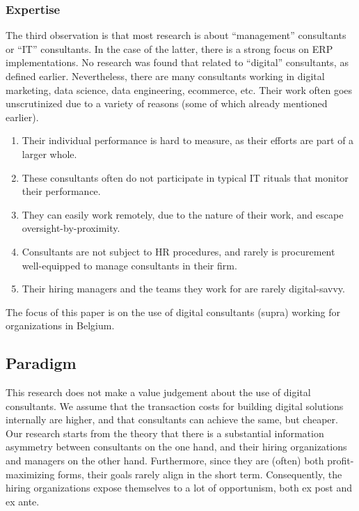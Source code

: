 \documentclass[
  man,floatsintext]{apa6}
\providecommand{\tightlist}{%
  \setlength{\itemsep}{0pt}\setlength{\parskip}{0pt}}
\begin{document}
\subsubsection{Expertise}\label{expertise}

The third observation is that most research is about ``management'' consultants or ``IT'' consultants. In the case of the latter, there is a strong focus on ERP implementations. No research was found that related to ``digital'' consultants, as defined earlier. Nevertheless, there are many consultants working in digital marketing, data science, data engineering, ecommerce, etc. Their work often goes unscrutinized due to a variety of reasons (some of which already mentioned earlier).

\begin{enumerate}
\def\labelenumi{\arabic{enumi}.}
\tightlist
\item
  Their individual performance is hard to measure, as their efforts are part of a larger whole.
\item
  These consultants often do not participate in typical IT rituals that monitor their performance.
\item
  They can easily work remotely, due to the nature of their work, and escape oversight-by-proximity.
\item
  Consultants are not subject to HR procedures, and rarely is procurement well-equipped to manage consultants in their firm.
\item
  Their hiring managers and the teams they work for are rarely digital-savvy.
\end{enumerate}

The focus of this paper is on the use of digital consultants (supra) working for organizations in Belgium.

\subsection{Paradigm}\label{paradigm}

This research does not make a value judgement about the use of digital consultants. We assume that the transaction costs for building digital solutions internally are higher, and that consultants can achieve the same, but cheaper. Our research starts from the theory that there is a substantial information asymmetry between consultants on the one hand, and their hiring organizations and managers on the other hand. Furthermore, since they are (often) both profit-maximizing forms, their goals rarely align in the short term. Consequently, the hiring organizations expose themselves to a lot of opportunism, both ex post and ex ante.
\end{document}
